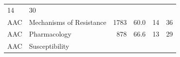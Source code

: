 \documentclass[11pt,]{article}
\begin{document}
\begin{longtable}[]{@{}llrrrr@{}}
\begin{minipage}[t]{0.11\columnwidth}
14\strut
\end{minipage} & \begin{minipage}[t]{0.11\columnwidth}\raggedleft\strut
30\strut
\end{minipage}\tabularnewline
\begin{minipage}[t]{0.06\columnwidth}\raggedright\strut
AAC\strut
\end{minipage} & \begin{minipage}[t]{0.43\columnwidth}\raggedright\strut
Mechanisms of Resistance\strut
\end{minipage} & \begin{minipage}[t]{0.04\columnwidth}\raggedleft\strut
1783\strut
\end{minipage} & \begin{minipage}[t]{0.08\columnwidth}\raggedleft\strut
60.0\strut
\end{minipage} & \begin{minipage}[t]{0.11\columnwidth}\raggedleft\strut
14\strut
\end{minipage} & \begin{minipage}[t]{0.11\columnwidth}\raggedleft\strut
36\strut
\end{minipage}\tabularnewline
\begin{minipage}[t]{0.06\columnwidth}\raggedright\strut
AAC\strut
\end{minipage} & \begin{minipage}[t]{0.43\columnwidth}\raggedright\strut
Pharmacology\strut
\end{minipage} & \begin{minipage}[t]{0.04\columnwidth}\raggedleft\strut
878\strut
\end{minipage} & \begin{minipage}[t]{0.08\columnwidth}\raggedleft\strut
66.6\strut
\end{minipage} & \begin{minipage}[t]{0.11\columnwidth}\raggedleft\strut
13\strut
\end{minipage} & \begin{minipage}[t]{0.11\columnwidth}\raggedleft\strut
29\strut
\end{minipage}\tabularnewline
\begin{minipage}[t]{0.06\columnwidth}\raggedright\strut
AAC\strut
\end{minipage} & \begin{minipage}[t]{0.43\columnwidth}\raggedright\strut
Susceptibility\strut
\end{minipage} & \begin{minipage}[t]{0.04\columnwidth}\raggedleft\strut

\end{minipage}
\end{longtable}
\end{document}
